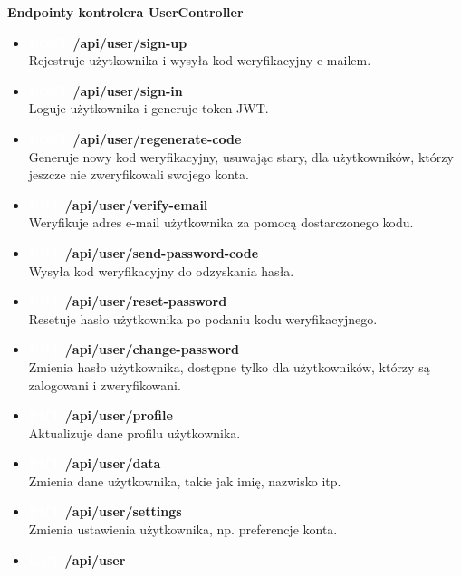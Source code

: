 \documentclass[12pt,a4paper]{article}
\begin{document}
\textbf{Endpointy kontrolera UserController}
\begin{itemize} 
    \item \textbf{\colorbox{green!90}{\textcolor{white}{POST}} /api/user/sign-up} \\
    Rejestruje użytkownika i wysyła kod weryfikacyjny e-mailem. 
    \item \textbf{\colorbox{green!90}{\textcolor{white}{POST}} /api/user/sign-in} \\
    Loguje użytkownika i generuje token JWT. 
    \item \textbf{\colorbox{green!90}{\textcolor{white}{POST}} /api/user/regenerate-code} \\
    Generuje nowy kod weryfikacyjny, usuwając stary, dla użytkowników, którzy jeszcze nie zweryfikowali swojego konta. 
    \item \textbf{\colorbox{orange!90}{\textcolor{white}{PUT}} /api/user/verify-email} \\
    Weryfikuje adres e-mail użytkownika za pomocą dostarczonego kodu. 
    \item \textbf{\colorbox{orange!90}{\textcolor{white}{PUT}} /api/user/send-password-code} \\
    Wysyła kod weryfikacyjny do odzyskania hasła. 
    \item \textbf{\colorbox{orange!90}{\textcolor{white}{PUT}} /api/user/reset-password} \\
    Resetuje hasło użytkownika po podaniu kodu weryfikacyjnego. 
    \item \textbf{\colorbox{orange!90}{\textcolor{white}{PUT}} /api/user/change-password} \\
    Zmienia hasło użytkownika, dostępne tylko dla użytkowników, którzy są zalogowani i zweryfikowani. 
    \item \textbf{\colorbox{orange!90}{\textcolor{white}{PUT}} /api/user/profile} \\
    Aktualizuje dane profilu użytkownika. 
    \item \textbf{\colorbox{orange!90}{\textcolor{white}{PUT}} /api/user/data} \\
    Zmienia dane użytkownika, takie jak imię, nazwisko itp. 
    \item \textbf{\colorbox{orange!90}{\textcolor{white}{PUT}} /api/user/settings} \\
    Zmienia ustawienia użytkownika, np. preferencje konta. 
    \item \textbf{\colorbox{cyan!90}{\textcolor{white}{GET}} /api/user} \\

\end{itemize}
\end{document}
